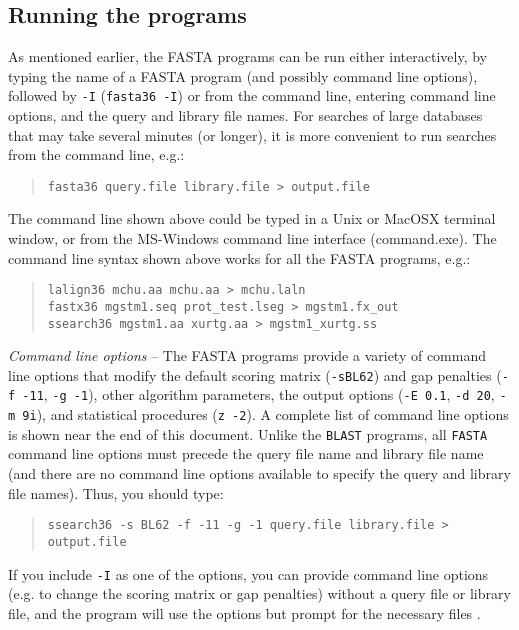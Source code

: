 \documentclass[11pt]{article}
\begin{document}
\subsection{Running the programs}
As mentioned earlier, the FASTA programs can be run either
interactively, by typing the name of a FASTA program (and possibly
command line options), followed by \texttt{-I} (\texttt{fasta36 -I})
or from the command line, entering command line options, and the
query and library file names. For searches of large databases that
may take several minutes (or longer), it is more convenient
to run searches from the command line, e.g.:
\begin{quote}
\begin{verbatim}
fasta36 query.file library.file > output.file
\end{verbatim}
\end{quote}
The command line shown above could be typed in a Unix or MacOSX
terminal window, or from the MS-Windows command line interface
(command.exe).  The command line syntax shown above works for all
the FASTA programs, e.g.:
\begin{quote}
\begin{verbatim}
lalign36 mchu.aa mchu.aa > mchu.laln
fastx36 mgstm1.seq prot_test.lseg > mgstm1.fx_out
ssearch36 mgstm1.aa xurtg.aa > mgstm1_xurtg.ss
\end{verbatim}
\end{quote}

\emph{Command line options} -- The FASTA programs provide a variety of
command line options that modify the default scoring matrix
(\texttt{-sBL62}) and gap penalties (\texttt{-f -11}, \texttt{-g -1}), other
algorithm parameters, the output options (\texttt{-E 0.1}, \texttt{-d 20},
\texttt{-m 9i}), and statistical procedures (\texttt{z -2}).  A complete
list of command line options is shown near the end of this document.
Unlike the \texttt{BLAST} programs, all \texttt{FASTA} command line options
must precede the query file name and library file name (and there are
no command line options available to specify the query and library
file names).  Thus, you should type:
\begin{quote}
\begin{verbatim}
ssearch36 -s BL62 -f -11 -g -1 query.file library.file > output.file
\end{verbatim}
\end{quote}
If you include \texttt{-I} as one of the options, you can provide
command line options (e.g. to change the scoring matrix or gap
penalties) without a query file or library file, and the program will
use the options but prompt for the necessary files .
\end{document}
